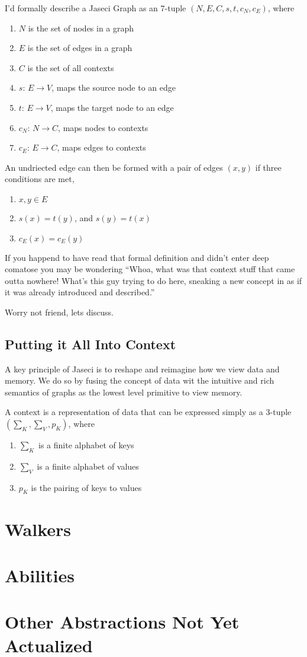 \begin{nerd}
    I'd formally describe a Jaseci Graph as an $7$-tuple $(N,E,C,s,t,c_N,c_E)$, where
    \begin{enumerate}
        \item $N$ is the set of nodes in a graph
        \item $E$ is the set of edges in a graph
        \item $C$ is the set of all contexts
        \item $s$: $E \rightarrow V$, maps the source node to an edge
        \item $t$: $E \rightarrow V$,  maps the target node to an edge
        \item $c_N$: $N \rightarrow C$, maps nodes to contexts
        \item $c_E$: $E \rightarrow C$, maps edges to contexts
    \end{enumerate}
    An undriected edge can then be formed with a pair of edges $(x, y)$ if three conditions are met,
    \begin{enumerate}
        \item $x, y \in E$
        \item $s(x) = t(y)$, and $s(y) = t(x)$
        \item $c_E(x) = c_E(y)$
    \end{enumerate}
\end{nerd}
\par
If you happend to have read that formal definition and didn't enter deep comatose you may be wondering ``Whoa, what was that context stuff that came outta nowhere! What's this guy trying to do here, sneaking a new concept in as if it was already introduced and described.''
\par
Worry not friend, lets discuss.
\subsection{Putting it All Into Context}

A key principle of Jaseci is to reshape and reimagine how we view data and memory. We do so by fusing the concept of data wit the intuitive and rich semantics of graphs as the lowest level primitive to view memory.

\begin{nerd}
    A context is a representation of data that can be expressed simply as a $3$-tuple $(\sum_K,\sum_V,p_K)$, where
    \begin{enumerate}
        \item $\sum_K$ is a finite alphabet of keys
        \item $\sum_V$ is a finite alphabet of values
        \item $p_K$ is the pairing of keys to values
    \end{enumerate}
\end{nerd}
\section{Walkers}
\section{Abilities}
\section{Other Abstractions Not Yet Actualized}

